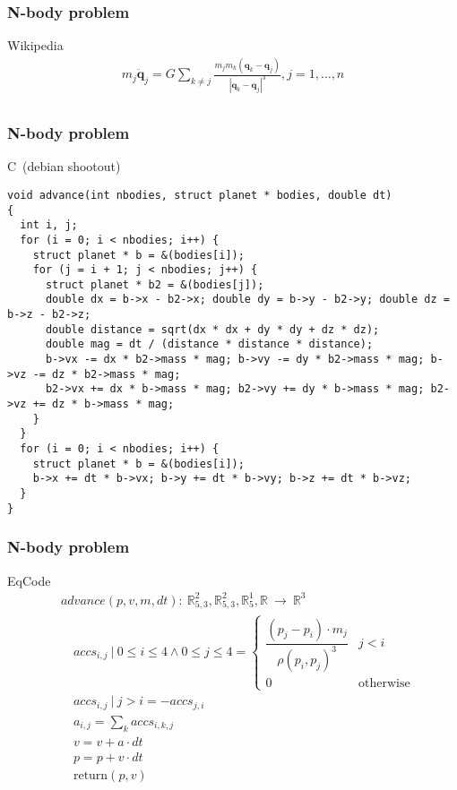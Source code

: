\documentclass[xcolor=dvipsnames,mathserif,professionalfont,12pt]{beamer}
\begin{document}
\begin{frame}[fragile]
  \frametitle{N-body problem}
  \begin{block}{Wikipedia}
    \begin{align*}
m_j	\ddot{\mathbf{q}}_j	= G \sum\limits_{k\neq j }  \frac{m_j
m_k(\mathbf{q}_k-\mathbf{q}_j)}{|\mathbf{q}_k-\mathbf{q}_j|^3}, j=1,\ldots,n \\
    \end{align*}
  \end{block}
\end{frame}

\begin{frame}[fragile]
  \frametitle{N-body problem}
\begin{block}{C\  (debian shootout)}
    \begin{lstlisting}
void advance(int nbodies, struct planet * bodies, double dt)
{
  int i, j;
  for (i = 0; i < nbodies; i++) {
    struct planet * b = &(bodies[i]);
    for (j = i + 1; j < nbodies; j++) {
      struct planet * b2 = &(bodies[j]);
      double dx = b->x - b2->x; double dy = b->y - b2->y; double dz = b->z - b2->z;
      double distance = sqrt(dx * dx + dy * dy + dz * dz);
      double mag = dt / (distance * distance * distance);
      b->vx -= dx * b2->mass * mag; b->vy -= dy * b2->mass * mag; b->vz -= dz * b2->mass * mag;
      b2->vx += dx * b->mass * mag; b2->vy += dy * b->mass * mag; b2->vz += dz * b->mass * mag;
    }
  }
  for (i = 0; i < nbodies; i++) {
    struct planet * b = &(bodies[i]);
    b->x += dt * b->vx; b->y += dt * b->vy; b->z += dt * b->vz;
  }
}
    \end{lstlisting}
  \end{block}
\end{frame}

\begin{frame}[fragile]
  \frametitle{N-body problem}
\begin{block}{EqCode}
  \begin{align*}
& advance(p, v, m, dt):\ \mathbb{R}^2_{5,3}, \mathbb{R}^2_{5,3}, \mathbb{R}^1_5,
\mathbb{R}\  \rightarrow\ \mathbb{R}^3 \\
& \quad  accs_{i,j}\  |\  0 \leq i \leq 4 \land 0 \leq j \leq 4 =
        \begin{cases}
            \dfrac{(p_j-p_i) \cdot m_j}{\rho(p_i,p_j)^3} & j < i \\
 0 & \text{otherwise}
       \end{cases} \\
& \quad accs_{i,j}\  |\  j > i = - accs_{j,i} \\
& \quad   a_{i,j} = \sum \limits_k accs_{i,k,j} \\
& \quad   v = v + a \cdot dt \\
& \quad   p = p + v \cdot dt \\
& \quad  \text{return}(p, v) \\
  \end{align*}
\end{block}
\end{frame}
\end{document}
